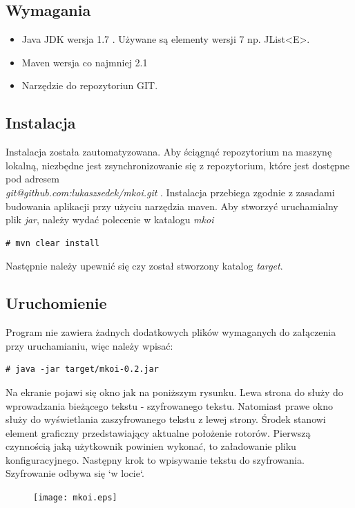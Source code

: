 \documentclass[11pt,a4paper,polish]{article}
\begin{document}
\subsection{Wymagania}
\begin{itemize}
  \item Java JDK wersja 1.7 . Używane są elementy wersji 7 np. JList<E>.
  \item Maven wersja co najmniej 2.1
  \item Narzędzie do repozytoriun GIT.
\end{itemize} 
\subsection{Instalacja}
Instalacja została zautomatyzowana. Aby ściągnąć repozytorium na maszynę
lokalną, niezbędne jest zsynchronizowanie się z repozytorium, które jest
dostępne pod adresem\\
\textit{git@github.com:lukaszsedek/mkoi.git}\cite{Git}
. Instalacja przebiega zgodnie z
zasadami budowania aplikacji przy użyciu narzędzia maven. Aby stworzyć
uruchamialny plik \textit{jar}, należy wydać polecenie w katalogu
\textit{mkoi}
\begin{verbatim}
# mvn clear install
\end{verbatim}
Następnie należy upewnić się czy został stworzony katalog \textit{target}.
\subsection{Uruchomienie}
Program nie zawiera żadnych dodatkowych plików wymaganych do załączenia przy
uruchamianiu, więc należy wpisać:
\begin{verbatim}
# java -jar target/mkoi-0.2.jar
\end{verbatim}
Na ekranie pojawi się okno jak na poniższym rysunku. Lewa strona do służy do
wprowadzania bieżącego tekstu - szyfrowanego tekstu. Natomiast prawe okno służy
do wyświetlania zaszyfrowanego tekstu z lewej strony. Środek stanowi element
graficzny przedstawiający aktualne położenie rotorów. Pierwszą czynnością jaką
użytkownik powinien wykonać, to załadowanie pliku konfiguracyjnego. Następny
krok to wpisywanie tekstu do szyfrowania. Szyfrowanie odbywa się `w locie`.
\newpage
\begin{figure}
\texttt{[image: mkoi.eps]}
\end{figure}


\end{document}
